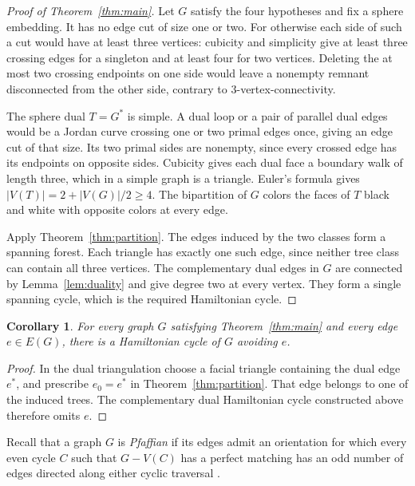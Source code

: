 \documentclass[11pt]{article}
\newtheorem{corollary}[theorem]{Corollary}
\theoremstyle{remark}
\newcommand{\abs}[1]{\left|#1\right|}
\numberwithin{equation}{section}
\begin{document}
\begin{proof}[Proof of Theorem~\ref{thm:main}]
Let \(G\) satisfy the four hypotheses and fix a sphere
embedding. It has no edge cut of size one or two.
For otherwise each side of such a cut would have
at least three vertices: cubicity and simplicity
give at least three crossing edges for a singleton
and at least four for two vertices.
Deleting the at most two crossing endpoints on
one side would leave a nonempty remnant disconnected
from the other side, contrary to \(3\)-vertex-connectivity.

The sphere dual \(T=G^*\) is simple. A dual loop
or a pair of parallel dual edges would be a Jordan
curve crossing one or two primal edges once,
giving an edge cut of that size. Its two primal
sides are nonempty, since every crossed edge
has its endpoints on opposite sides.
Cubicity gives each dual face a boundary walk
of length three, which in a simple graph is
a triangle. Euler's formula gives
\(\abs{V(T)}=2+\abs{V(G)}/2\ge4\).
The bipartition of \(G\) colors the faces of \(T\)
black and white with opposite colors at every edge.

Apply Theorem~\ref{thm:partition}. The edges induced
by the two classes form a spanning forest.
Each triangle has exactly one such edge, since
neither tree class can contain all three vertices.
The complementary dual edges in \(G\) are connected
by Lemma~\ref{lem:duality} and give degree two at
every vertex. They form a single spanning cycle,
which is the required Hamiltonian cycle.
\end{proof}

\begin{corollary}\label{cor:edge-avoidance}
For every graph \(G\) satisfying Theorem~\ref{thm:main} and every
edge \(e\in E(G)\), there is a Hamiltonian cycle of \(G\) avoiding \(e\).
\end{corollary}

\begin{proof}
In the dual triangulation choose a facial triangle containing the dual
edge \(e^*\), and prescribe \(e_0=e^*\) in
Theorem~\ref{thm:partition}. That edge belongs to one of the induced
trees. The complementary dual Hamiltonian cycle constructed above
therefore omits \(e\).
\end{proof}

Recall that a graph \(G\) is \emph{Pfaffian} if its edges admit an
orientation for which every even cycle \(C\) such that \(G-V(C)\)
has a perfect matching has an odd number of edges directed along either
cyclic traversal \cite[Section~4]{GSW2023}.
\end{document}
